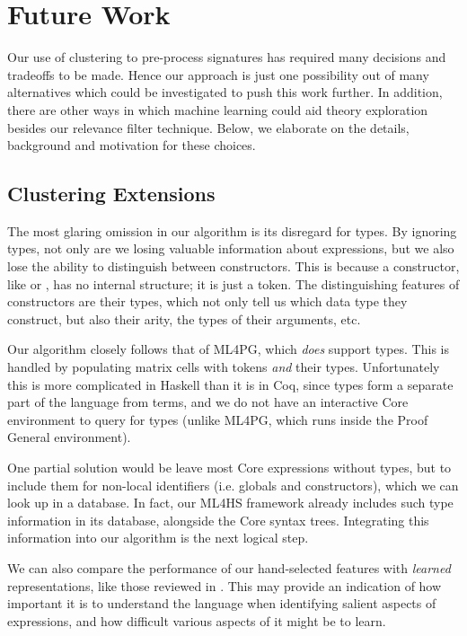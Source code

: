 \section{Future Work}
\label{sec:future}

Our use of clustering to pre-process \qspec{} signatures has required many decisions and tradeoffs to be made. Hence our approach is just one possibility out of many alternatives which could be investigated to push this work further. In addition, there are other ways in which machine learning could aid theory exploration besides our relevance filter technique. Below, we elaborate on the details, background and motivation for these choices.

\subsection{Clustering Extensions}
\label{sec:preprocessing}

The most glaring omission in our algorithm is its disregard for types. By ignoring types, not only are we losing valuable information about expressions, but we also lose the ability to distinguish between constructors. This is because a constructor, like  or , has no internal structure; it is just a token. The distinguishing features of constructors are their types, which not only tell us which data type they construct, but also their arity, the types of their arguments, etc.

Our algorithm closely follows that of ML4PG, which \emph{does} support types. This is handled by populating matrix cells with tokens \emph{and} their types. Unfortunately this is more complicated in Haskell than it is in Coq, since types form a separate part of the language from terms, and we do not have an interactive Core environment to query for types (unlike ML4PG, which runs inside the Proof General environment).

One partial solution would be leave most Core expressions without types, but to include them for non-local identifiers (i.e. globals and constructors), which we can look up in a database. In fact, our ML4HS framework already includes such type information in its database, alongside the Core syntax trees. Integrating this information into our algorithm is the next logical step.

We can also compare the performance of our hand-selected features with \emph{learned} representations, like those reviewed in \cite{bengio2013representation}. This may provide an indication of how important it is to understand the language when identifying salient aspects of expressions, and how difficult various aspects of it might be to learn.

